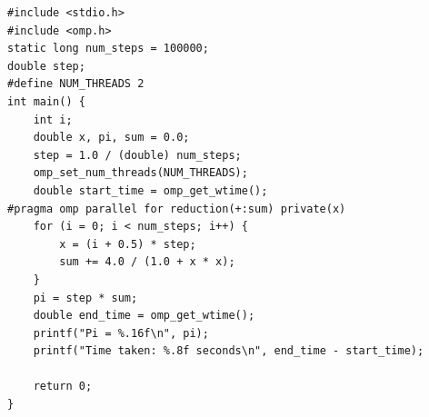 \documentclass{article}
\begin{document}
\begin{lstlisting}[style=cstyle,caption={并行$\pi$值计算4}]
#include <stdio.h>
#include <omp.h>
static long num_steps = 100000;
double step;
#define NUM_THREADS 2
int main() {
    int i;
    double x, pi, sum = 0.0;
    step = 1.0 / (double) num_steps;
    omp_set_num_threads(NUM_THREADS);
    double start_time = omp_get_wtime();
#pragma omp parallel for reduction(+:sum) private(x)
    for (i = 0; i < num_steps; i++) {
        x = (i + 0.5) * step;
        sum += 4.0 / (1.0 + x * x);
    }
    pi = step * sum;
    double end_time = omp_get_wtime();
    printf("Pi = %.16f\n", pi);
    printf("Time taken: %.8f seconds\n", end_time - start_time);

    return 0;
}
\end{lstlisting}
\end{document}
